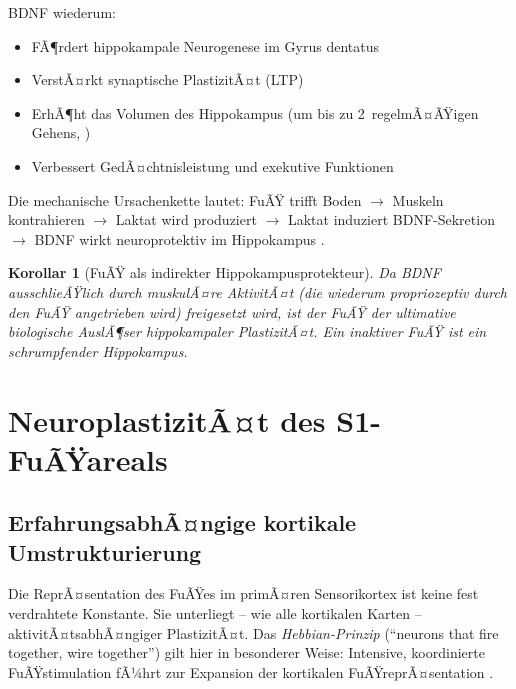 ﻿\documentclass[12pt,a4paper]{report}
\theoremstyle{plain}
\newtheorem{korollar}[theorem]{Korollar}
\theoremstyle{definition}
\theoremstyle{remark}
\begin{document}
BDNF wiederum:
\begin{itemize}
\item FÃ¶rdert hippokampale Neurogenese im Gyrus dentatus
\item VerstÃ¤rkt synaptische PlastizitÃ¤t (LTP)
\item ErhÃ¶ht das Volumen des Hippokampus (um bis zu 2\,%
  regelmÃ¤ÃŸigen Gehens, \cite{erickson2011})
\item Verbessert GedÃ¤chtnisleistung und exekutive Funktionen
\end{itemize}

Die mechanische Ursachenkette lautet: FuÃŸ trifft Boden $\to$ Muskeln
kontrahieren $\to$ Laktat wird produziert $\to$ Laktat induziert BDNF-Sekretion
$\to$ BDNF wirkt neuroprotektiv im Hippokampus \cite{brooks2020}.

\begin{korollar}[FuÃŸ als indirekter Hippokampusprotekteur]
Da BDNF ausschlieÃŸlich durch muskulÃ¤re AktivitÃ¤t (die wiederum propriozeptiv
durch den FuÃŸ angetrieben wird) freigesetzt wird, ist der FuÃŸ der ultimative
biologische AuslÃ¶ser hippokampaler PlastizitÃ¤t. Ein inaktiver FuÃŸ ist ein
schrumpfender Hippokampus.
\end{korollar}

\chapter{NeuroplastizitÃ¤t des S1-FuÃŸareals}

\section{ErfahrungsabhÃ¤ngige kortikale Umstrukturierung}

Die ReprÃ¤sentation des FuÃŸes im primÃ¤ren Sensorikortex ist keine fest
verdrahtete Konstante. Sie unterliegt -- wie alle kortikalen Karten --
aktivitÃ¤tsabhÃ¤ngiger PlastizitÃ¤t. Das \emph{Hebbian-Prinzip}
(``neurons that fire together, wire together'') gilt hier in besonderer
Weise: Intensive, koordinierte FuÃŸstimulation fÃ¼hrt zur Expansion der
kortikalen FuÃŸreprÃ¤sentation \cite{merzenich1984}.
\end{document}
